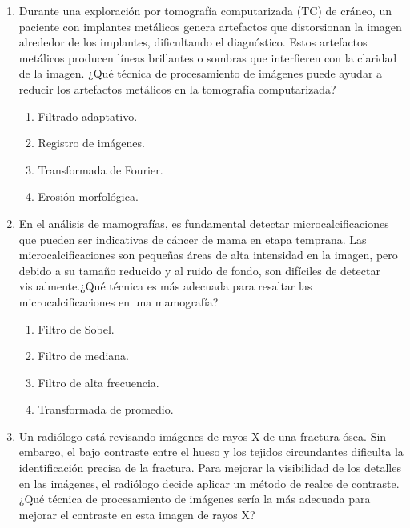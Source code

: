 \documentclass[12pt,a4paper]{article}
\providecommand{\tightlist}{%
  \setlength{\itemsep}{0pt}\setlength{\parskip}{0pt}}\usepackage{longtable,booktabs,array}
\providecommand{\tightlist}{%
  \setlength{\itemsep}{0pt}\setlength{\parskip}{2pt}}
\begin{document}
\setcounter{page}{2} %
\begin{enumerate}
\tightlist
\item
  Durante una exploración por tomografía computarizada (TC) de cráneo,
  un paciente con implantes metálicos genera artefactos que distorsionan
  la imagen alrededor de los implantes, dificultando el diagnóstico.
  Estos artefactos metálicos producen líneas brillantes o sombras que
  interfieren con la claridad de la imagen. ¿Qué técnica de
  procesamiento de imágenes puede ayudar a reducir los artefactos
  metálicos en la tomografía computarizada?

  \begin{enumerate}
  \tightlist
  \item
    Filtrado adaptativo.
  \item
    Registro de imágenes.
  \item
    Transformada de Fourier.
  \item
    Erosión morfológica.
  \end{enumerate}
\item
  En el análisis de mamografías, es fundamental detectar
  microcalcificaciones que pueden ser indicativas de cáncer de mama en
  etapa temprana. Las microcalcificaciones son pequeñas áreas de alta
  intensidad en la imagen, pero debido a su tamaño reducido y al ruido
  de fondo, son difíciles de detectar visualmente.¿Qué técnica es más
  adecuada para resaltar las microcalcificaciones en una mamografía?

  \begin{enumerate}
  \tightlist
  \item
    Filtro de Sobel.
  \item
    Filtro de mediana.
  \item
    Filtro de alta frecuencia.
  \item
    Transformada de promedio.
  \end{enumerate}
\item
  Un radiólogo está revisando imágenes de rayos X de una fractura ósea.
  Sin embargo, el bajo contraste entre el hueso y los tejidos
  circundantes dificulta la identificación precisa de la fractura. Para
  mejorar la visibilidad de los detalles en las imágenes, el radiólogo
  decide aplicar un método de realce de contraste.¿Qué técnica de
  procesamiento de imágenes sería la más adecuada para mejorar el
  contraste en esta imagen de rayos X?


\end{enumerate}
\end{document}
